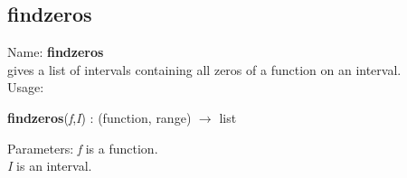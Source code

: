 \subsection{ findzeros }
\noindent Name: \textbf{findzeros}\\
gives a list of intervals containing all zeros of a function on an interval.\\

\noindent Usage: 
\begin{center}
\textbf{findzeros}(\emph{f},\emph{I}) : (\textsf{function}, \textsf{range}) $\rightarrow$ \textsf{list}\\
\end{center}
Parameters: 
\emph{f} is a function.\\
\emph{I} is an interval.\\

